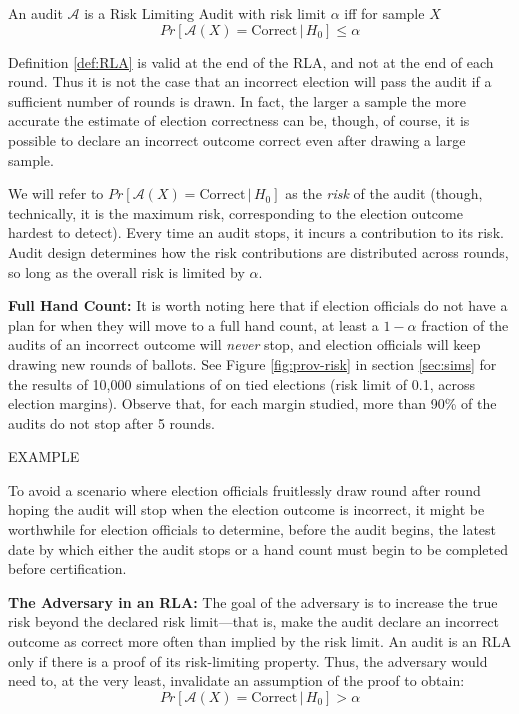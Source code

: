 \begin{definition}
\label{def:RLA}
An audit $\mathcal{A}$ is a Risk Limiting Audit with 
risk limit $\alpha$ iff for sample $X$
$$
Pr[\mathcal{A}(X) 
= \text{Correct} \,|\, H_0]\le \alpha
$$
\end{definition}

Definition \ref{def:RLA} is valid at the end of the RLA, and not at the end of each round. Thus it is not the case that an incorrect election will pass the audit if a sufficient number of rounds is drawn. In fact, the larger a sample the more accurate the estimate of election correctness can be, though, of course, it is possible to declare an incorrect outcome correct even after drawing a large sample. 

We will refer to $Pr[\mathcal{A}(X) = \text{Correct} \,|\, H_0]$ as the {\em risk} of the audit (though, technically, it is the maximum risk, corresponding to the election outcome hardest to detect). Every time an audit stops, it incurs a contribution to its risk. Audit design determines how the risk contributions are distributed across rounds, so long as the overall risk is limited by $\alpha$.  


{\bf Full Hand Count:} It is worth noting here that if election officials do not have a plan for when they will move to a full hand count, at least a $1-\alpha$ fraction of the audits of an incorrect outcome will {\em never} stop, and election officials will keep drawing new rounds of ballots. See Figure \ref{fig:prov-risk} in section \ref{sec:sims} for the results of 10,000 simulations of \Providence on tied elections (risk limit of 0.1, across election margins). Observe that, for each margin studied, more than 90\% of the audits do not stop after 5 rounds. 

EXAMPLE 

To avoid a scenario where election officials fruitlessly draw round after round hoping the audit will stop when the election outcome is incorrect, it might be worthwhile for election officials to determine, before the audit begins, the latest date by which either the audit stops or a hand count must begin to be completed before certification. 

{\bf The Adversary in an RLA:} The goal of the adversary is to increase the true risk beyond the declared risk limit---that is, make the audit declare an incorrect outcome as correct more often than implied by the risk limit. An audit is an RLA only if there is a proof of its risk-limiting property. Thus, the adversary would need to, at the very least, invalidate an assumption of the proof to obtain:  
$$
Pr[\mathcal{A}(X) 
= \text{Correct} \,|\, H_0] > \alpha
$$

